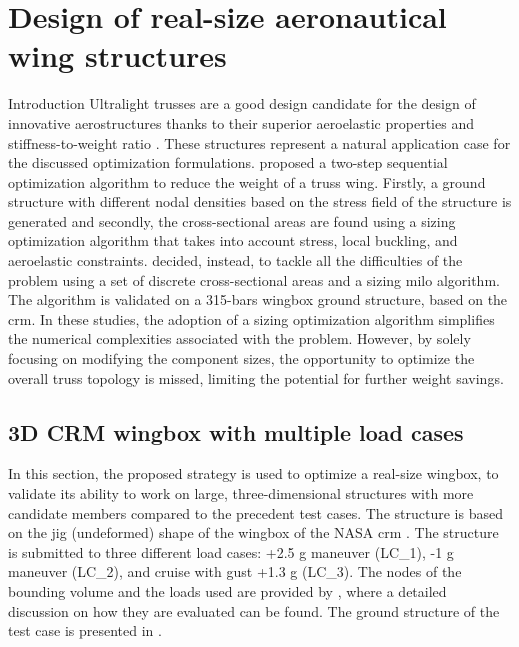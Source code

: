 \setchapterpreamble[u]{\margintoc}
\glsresetall %

\chapter{Design of real-size aeronautical wing structures}
Introduction
Ultralight trusses are a good design candidate for the design of innovative aerostructures thanks to their superior aeroelastic properties and stiffness-to-weight ratio \cite{cramer_elastic_2019}. These structures represent a natural application case for the discussed optimization formulations. \cite{opgenoord_aeroelastic_2018, opgenoord_design_2019} proposed a two-step sequential optimization algorithm to reduce the weight of a truss wing. Firstly, a ground structure with different nodal densities based on the stress field of the structure is generated and secondly, the cross-sectional areas are found using a sizing optimization algorithm that takes into account stress, local buckling, and aeroelastic constraints. \cite{shahabsafa_novel_2018} decided, instead, to tackle all the difficulties of the problem using a set of discrete cross-sectional areas and a sizing \gls{milo} algorithm. The algorithm is validated on a 315-bars wingbox ground structure, based on the \gls{crm}. In these studies, the adoption of a sizing optimization algorithm simplifies the numerical complexities associated with the problem. However, by solely focusing on modifying the component sizes, the opportunity to optimize the overall truss topology is missed, limiting the potential for further weight savings.
\section{3D CRM wingbox with multiple load cases}

In this section, the proposed strategy is used to optimize a real-size wingbox, to validate its ability to work on large, three-dimensional structures with more candidate members compared to the precedent test cases. The structure is based on the jig (undeformed) shape of the wingbox of the NASA \gls{crm} \citep{brooks_benchmark_2018}. The structure is submitted to three different load cases: +2.5 g maneuver (LC\_1), -1 g maneuver (LC\_2), and cruise with gust +1.3 g (LC\_3). The nodes of the bounding volume and the loads used are provided by \cite{fakhimi_discrete_2021}, where a detailed discussion on how they are evaluated can be found. The ground structure of the test case is presented in .

